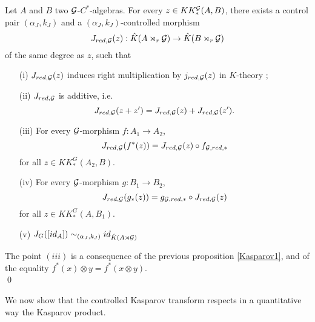 \begin{prop}
Let $A$ and $B$ two $\mathcal G$-$C^*$-algebras. For every $z\in KK^\mathcal G_*(A,B)$, there exists a control pair $(\alpha_J,k_J)$ and a $(\alpha_J,k_J)$-controlled morphism
\[J_{red,\mathcal G}(z) : \hat K(A\rtimes_r \mathcal G)\rightarrow \hat K(B\rtimes_r \mathcal G)\]
of the same degree as $z$, such that
\begin{enumerate}
\item[(i)] $J_{red,\mathcal G}(z)$ induces right multiplication by $j_{red,\mathcal G}(z)$ in $K$-theory ;
\item[(ii)] $J_{red,\mathcal G}$ is additive, i.e.
\[J_{red,\mathcal G}(z+z')=J_{red,\mathcal G}(z)+J_{red,\mathcal G}(z').\]
\item[(iii)] For every $\mathcal G$-morphism $f : A_1\rightarrow A_2$,
\[J_{red,\mathcal G}(f^*(z))=J_{red,\mathcal G}(z)\circ f_{\mathcal G,red,*}\] for all $z\in KK_*^G(A_2,B)$.
\item[(iv)] For every $\mathcal G$-morphism $g : B_1\rightarrow B_2$,
\[J_{red,\mathcal G}(g_*(z))= g_{\mathcal G,red,*}\circ J_{red,\mathcal G}(z)\] for all $z\in KK_*^G(A,B_1)$.
\item[(v)] $J_G([id_A]) \sim_{(\alpha_J,k_J)} id_{\hat K(A\rtimes \mathcal G)}$
\end{enumerate}
\end{prop}

\begin{dem}
The point $(iii)$ is a consequence of the previous proposition \ref{Kasparov1}, and of the equality $f^*(x)\otimes y = f^*(x\otimes y)$.\\
\qed
\end{dem}

We now show that the controlled Kasparov transform respects in a quantitative way the Kasparov product.

